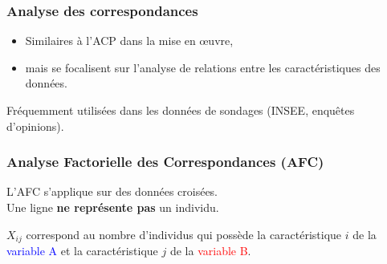 \begin{frame}
  \frametitle{Analyse des correspondances}
  \begin{itemize}
    \item Similaires à l'ACP dans la mise en \oe uvre,
    \item mais se focalisent sur l'analyse de relations entre les caractéristiques des données.
  \end{itemize}

  Fréquemment utilisées dans les données de sondages (INSEE, enquêtes d'opinions).
\end{frame}

\begin{frame}
  \frametitle{Analyse Factorielle des Correspondances (AFC)}
  \begin{center}
    L'AFC s'applique sur des données croisées.\\Une ligne \textbf{ne représente pas} un individu. 
  \end{center}
  
  \begin{minipage}{0.45\linewidth}
  \end{minipage}
  \hfill
  \begin{minipage}{0.49\linewidth}
    $X_{ij}$ correspond au nombre d'individus qui possède la caractéristique $i$ de la \textcolor{blue}{variable A} et la caractéristique $j$ de la \textcolor{red}{variable B}.
  \end{minipage}
\end{frame}

